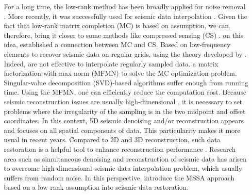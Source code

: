 For a long time, the low-rank method has been broadly applied for noise removal \citep{freire1988application,Trickett2008Cadzow,sacchi2009fx,trickett2009prestack}. More recently, it was successfully used for seismic data interpolation  \citep{oropeza2011simultaneous,chiu2014multidimensional,gan2015dealiased,huang2016damped,chen2016open,chen2016simultaneous,zhang2017hybrid,yangkang2020odrr}. Given the fact that low-rank matrix completion (MC) is based on  assumption, we can, therefore, bring it closer to some methods like compressed sensing (CS) \citep{candes2009exact}.  on this idea, \citet{recht2010guaranteed} established a connection between MC and CS. Based on low-frequency elements to recover seismic data on regular grids, \citet{naghizadeh2012multidimensional}  using the theory developed by \citet{spitz1991seismic}. Indeed,  are not effective to interpolate regularly sampled data. 
\citet{kumar2012fast}  a matrix factorization with max-norm (MFMN) \citep{lee2010practical} to solve the MC optimization problem. Singular-value decomposition (SVD)-based algorithms suffer enough from running time. Using the MFMN, one can efficiently reduce the computation cost.
Because seismic reconstruction issues are usually high-dimensional \citep{liu2004minimum,xu2010antileakage}, it is necessary to set problems where the irregularity of the sampling is in the two midpoint and offset coordinates. In this context, 5D seismic denoising and/or reconstruction appears and focuses on all spatial components of data. This particularity makes it more usual in recent years. Compared to 2D and 3D reconstruction, such data restoration is a helpful tool to enhance reconstruction performance \citep{gao2015parallel}.
Research area such as simultaneous denoising and reconstruction of seismic data \citep{oropeza2011simultaneous,chen2016simultaneous,zhang2017hybrid} has arisen to overcome high-dimensional seismic data interpolation problem, which usually suffers from random noise. In this perspective, \citet{oropeza2011simultaneous} introduce the MSSA approach based on a low-rank assumption into seismic data restoration. 
